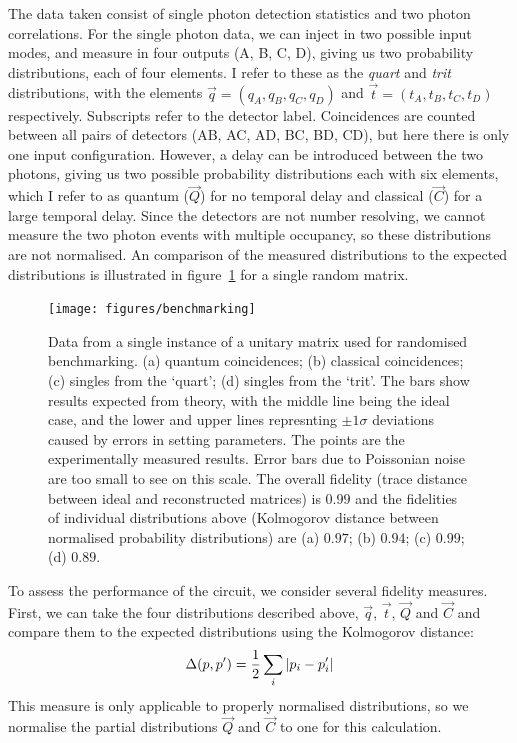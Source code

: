 The data taken consist of single photon detection statistics and two photon
correlations. For the single photon data, we can inject in two possible input
modes, and measure in four outputs (A, B, C, D), giving us two probability
distributions, each of four elements. I refer to these as the \emph{quart}
and \emph{trit} distributions, with the elements \(\vec{q}= \left( q_{A}, q_{B},
q_{C}, q_{D} \right)\) and \(\vec{t} = \left( t_{A}, t_{B}, t_{C}, t_{D}
\right)\) respectively. Subscripts refer to the detector label. Coincidences are
counted between all pairs of detectors (AB, AC, AD, BC, BD, CD), but here there
is only one input configuration. However, a delay can be introduced between
the two photons, giving us two possible probability distributions each with six
elements, which I refer to as quantum (\(\vec{Q}\)) for no temporal delay and
classical (\(\vec{C}\)) for a large temporal delay. Since the detectors are not
number resolving, we cannot measure the two photon events with multiple
occupancy, so these distributions are not normalised. An comparison of the
measured distributions to the expected distributions is illustrated in
figure~\ref{fig:benchmarking} for a single random matrix.

\begin{figure}[t]
  \texttt{[image: figures/benchmarking]}
  \caption[Sample data from randomised benchmarking]
  {Data from a single instance of a unitary matrix used for randomised
  benchmarking. (a) quantum coincidences; (b) classical coincidences; (c)
  singles from the `quart'; (d) singles from the `trit'. The bars show results 
  expected from theory, with the middle line being the ideal case, and the lower
  and upper lines represnting \(\pm 1\sigma\) deviations caused by errors in
  setting parameters. The points are the experimentally measured results. Error
  bars due to Poissonian noise are too small to see on this scale. The overall
  fidelity (trace distance between ideal and reconstructed matrices) is \(0.99\)
  and the fidelities of individual distributions above (Kolmogorov distance
  between normalised probability distributions) are (a) \(0.97\); (b) \(0.94\);
  (c) \(0.99\); (d) \(0.89\).}
  \label{fig:benchmarking}
\end{figure}

To assess the performance of the circuit, we consider several fidelity measures.
First, we can take the four distributions described above, \(\vec{q}\),
\(\vec{t}\), \(\vec{Q}\) and \(\vec{C}\) and compare them to the expected
distributions using the Kolmogorov distance:
\begin{equation}
  \Delta \!\left( p,p^{\prime} \right) = \frac{1}{2} \sum_{i} \left|p_{i} - p_{i}^{\prime}\right|
\end{equation}
This measure is only applicable to properly normalised distributions, so we
normalise the partial distributions \(\vec{Q}\) and \(\vec{C}\) to one for this
calculation.

